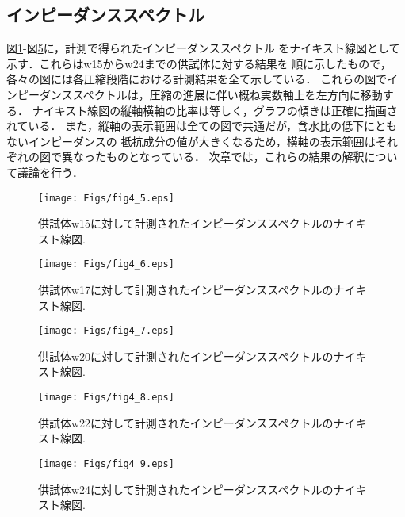 \subsection{インピーダンススペクトル}
図\ref{fig:fig4_5}-図\ref{fig:fig4_9}に，計測で得られたインピーダンススペクトル
をナイキスト線図として示す．これらはw15からw24までの供試体に対する結果を
順に示したもので，各々の図には各圧縮段階における計測結果を全て示している．
これらの図でインピーダンススペクトルは，圧縮の進展に伴い概ね実数軸上を左方向に移動する．
ナイキスト線図の縦軸横軸の比率は等しく，グラフの傾きは正確に描画されている．
また，縦軸の表示範囲は全ての図で共通だが，含水比の低下にともないインピーダンスの
抵抗成分の値が大きくなるため，横軸の表示範囲はそれぞれの図で異なったものとなっている．
次章では，これらの結果の解釈について議論を行う．
\begin{figure}[h]
	\begin{center}
	\texttt{[image: Figs/fig4\_5.eps]} 
	\end{center}
	\caption{
		供試体w15に対して計測されたインピーダンススペクトルのナイキスト線図.
	} 
	\label{fig:fig4_5}
\end{figure}
\begin{figure}[h]
	\begin{center}
	\texttt{[image: Figs/fig4\_6.eps]} 
	\end{center}
	\caption{
		供試体w17に対して計測されたインピーダンススペクトルのナイキスト線図.
	} 
	\label{fig:fig4_6}
\end{figure}
\begin{figure}[h]
	\begin{center}
	\texttt{[image: Figs/fig4\_7.eps]} 
	\end{center}
	\caption{
		供試体w20に対して計測されたインピーダンススペクトルのナイキスト線図.
	} 
	\label{fig:fig4_7}
\end{figure}
\begin{figure}[h]
	\begin{center}
	\texttt{[image: Figs/fig4\_8.eps]} 
	\end{center}
	\caption{
		供試体w22に対して計測されたインピーダンススペクトルのナイキスト線図.
	} 
	\label{fig:fig4_8}
\end{figure}
\begin{figure}[h]
	\begin{center}
	\texttt{[image: Figs/fig4\_9.eps]} 
	\end{center}
	\caption{
		供試体w24に対して計測されたインピーダンススペクトルのナイキスト線図.
	} 
	\label{fig:fig4_9}
\end{figure}
